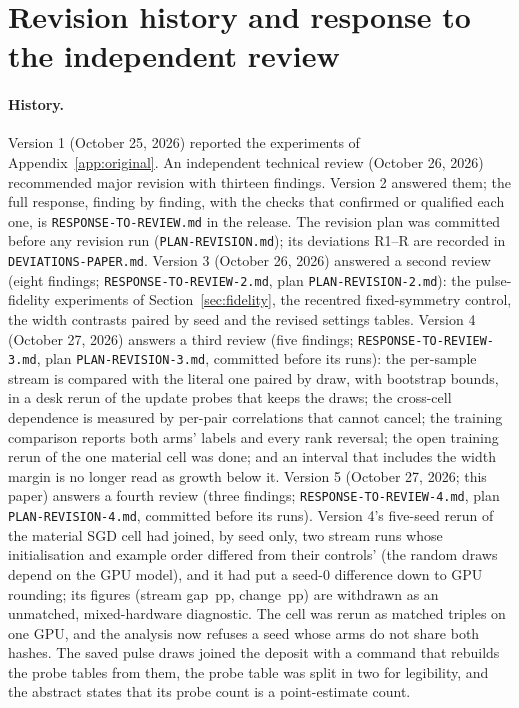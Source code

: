 \section{Revision history and response to the independent review}\label{app:revision}
\paragraph{History.} Version 1 (October 25, 2026) reported the experiments of Appendix~\ref{app:original}. An independent
technical review (October 26, 2026) recommended major revision with thirteen findings. Version 2 answered them; the
full response, finding by finding, with the checks that confirmed or qualified each one, is \texttt{RESPONSE-TO-REVIEW.md} in
the release. The revision plan was committed before any revision run (\texttt{PLAN-REVISION.md}); its deviations R1--R\RVnDev{}
are recorded in \texttt{DEVIATIONS-PAPER.md}. Version 3 (October 26, 2026) answered a second review (eight findings;
\texttt{RESPONSE-TO-REVIEW-2.md}, plan \texttt{PLAN-REVISION-2.md}): the pulse-fidelity experiments of
Section~\ref{sec:fidelity}, the recentred fixed-symmetry control, the width contrasts paired by seed and the revised
settings tables. Version 4 (October 27, 2026) answers a third review (five findings;
\texttt{RESPONSE-TO-REVIEW-3.md}, plan \texttt{PLAN-REVISION-3.md}, committed before its runs): the per-sample stream is
compared with the literal one paired by draw, with bootstrap bounds, in a desk rerun of the update probes that keeps the
draws; the cross-cell dependence is measured by per-pair correlations that cannot cancel; the training comparison reports
both arms' labels and every rank reversal; the open training rerun of the one material cell was done; and an interval that
includes the width margin is no longer read as growth below it. Version 5 (October 27, 2026; this paper) answers a
fourth review (three findings; \texttt{RESPONSE-TO-REVIEW-4.md}, plan \texttt{PLAN-REVISION-4.md}, committed before
its runs). Version 4's five-seed rerun of the material SGD cell had joined, by seed only, two stream runs whose
initialisation and example order differed from their controls' (the random draws depend on the GPU model), and it
had put a seed-0 difference down to GPU rounding; its figures (stream gap \RYAtwoRSeqGap\,pp, change \RYAtwoRD\,pp)
are withdrawn as an unmatched, mixed-hardware diagnostic. The cell was rerun as matched triples on one GPU, and the
analysis now refuses a seed whose arms do not share both hashes. The saved pulse draws joined the deposit with a
command that rebuilds the probe tables from them, the probe table was split in two for legibility, and the abstract
states that its probe count is a point-estimate count.

